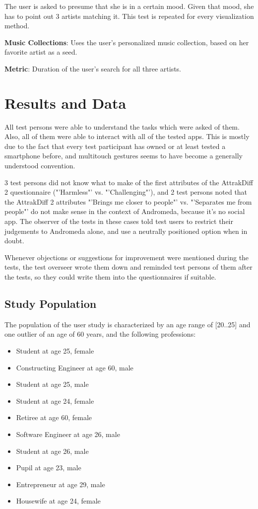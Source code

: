The user is asked to presume that she is in a certain mood. Given that mood, she has to point out 3 artists matching it. This test is repeated for every visualization method.
	
\textbf{Music Collections}: Uses the user's personalized music collection, based on her favorite artist as a seed.
	
\textbf{Metric}: Duration of the user's search for all three artists.


\section{Results and Data}

All test persons were able to understand the tasks which were asked of them. Also, all of them were able to interact with all of the tested apps. This is mostly due to the fact that every test participant has owned or at least tested a smartphone before, and multitouch gestures seems to have become a generally understood convention.

3 test persons did not know what to make of the first attributes of the AttrakDiff 2 questionnaire ("'Harmless"' vs. "'Challenging"'), and 2 test persons noted that the AttrakDiff 2 attributes "'Brings me closer to people"' vs. "'Separates me from people"' do not make sense in the context of Andromeda, because it's no social app. The observer of the tests in these cases told test users to restrict their judgements to Andromeda alone, and use a neutrally positioned option when in doubt.

Whenever objections or suggestions for improvement were mentioned during the tests, the test overseer wrote them down and reminded test persons of them after the tests, so they could write them into the questionnaires if suitable.

\subsection{Study Population}

The population of the user study is characterized by an age range of [20..25] and one outlier of an age of 60 years, and the following professions:

\begin{itemize}
	\item Student at age 25, female
	\item Constructing Engineer at age 60, male
	\item Student at age 25, male
	\item Student at age 24, female
	\item Retiree at age 60, female
	\item Software Engineer at age 26, male
	\item Student at age 26, male
	\item Pupil at age 23, male
	\item Entrepreneur at age 29, male
	\item Housewife at age 24, female
\end{itemize}

